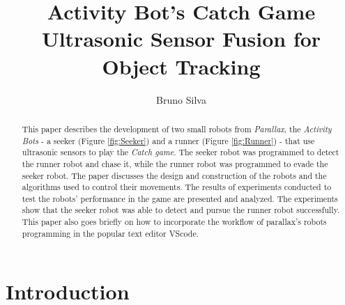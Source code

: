 \documentclass[sigconf,nonacm]{acmart}
\begin{document}
\title{Activity Bot's Catch Game\\
Ultrasonic Sensor Fusion for Object Tracking}

\author{Bruno Silva  }

    
    
    \begin{abstract}
    
This paper describes the development of two small robots from \textit{Parallax}, the \textit{Activity
Bots} - a seeker (Figure \ref{fig:Seeker}) and a runner (Figure \ref{fig:Runner})
- that use ultrasonic sensors to play the \textit{Catch game}. The seeker robot was
programmed to detect the runner robot and chase it, while the runner robot was
programmed to evade the seeker robot. The paper discusses the design and
construction of the robots and the algorithms used to control their movements.
The results of experiments conducted to test the robots' performance in the game
are presented and analyzed. The experiments show that the seeker robot was able
to detect and pursue the runner robot successfully.
This paper also goes briefly on how to incorporate the workflow of parallax's
robots programming in the popular text editor VScode.
 

    \end{abstract}
    
    \maketitle



\section{Introduction}
\end{document}
